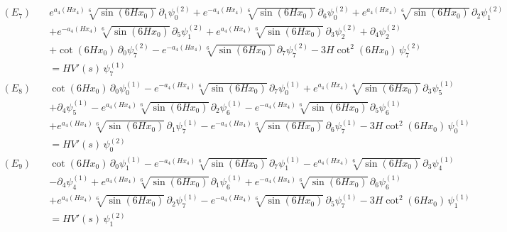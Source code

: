 \begin{align*}
(E_{7})\quad & e^{a_4\left(H x_4\right)} \sqrt[6]{\sin \left(6 H x_0\right)}\,\partial_{1}\psi^{(2)}_{0} + e^{-a_4\left(H x_4\right)} \sqrt[6]{\sin \left(6 H x_0\right)}\,\partial_{6}\psi^{(2)}_{0} + e^{a_4\left(H x_4\right)} \sqrt[6]{\sin \left(6 H x_0\right)}\,\partial_{2}\psi^{(2)}_{1} \\
 &  + e^{-a_4\left(H x_4\right)} \sqrt[6]{\sin \left(6 H x_0\right)}\,\partial_{5}\psi^{(2)}_{1} + e^{a_4\left(H x_4\right)} \sqrt[6]{\sin \left(6 H x_0\right)}\,\partial_{3}\psi^{(2)}_{2} + \partial_{4}\psi^{(2)}_{2} \\
 &  + \cot \left(6 H x_0\right)\,\partial_{0}\psi^{(2)}_{7} - e^{-a_4\left(H x_4\right)} \sqrt[6]{\sin \left(6 H x_0\right)}\,\partial_{7}\psi^{(2)}_{7} - 3 H \cot ^2\left(6 H x_0\right)\,\psi^{(2)}_{7} \\
 & = H V'(s)\,\psi^{(1)}_{7}
\end{align*}
\begin{align*}
(E_{8})\quad & \cot \left(6 H x_0\right)\,\partial_{0}\psi^{(1)}_{0} - e^{-a_4\left(H x_4\right)} \sqrt[6]{\sin \left(6 H x_0\right)}\,\partial_{7}\psi^{(1)}_{0} + e^{a_4\left(H x_4\right)} \sqrt[6]{\sin \left(6 H x_0\right)}\,\partial_{3}\psi^{(1)}_{5} \\
 &  + \partial_{4}\psi^{(1)}_{5} - e^{a_4\left(H x_4\right)} \sqrt[6]{\sin \left(6 H x_0\right)}\,\partial_{2}\psi^{(1)}_{6} - e^{-a_4\left(H x_4\right)} \sqrt[6]{\sin \left(6 H x_0\right)}\,\partial_{5}\psi^{(1)}_{6} \\
 &  + e^{a_4\left(H x_4\right)} \sqrt[6]{\sin \left(6 H x_0\right)}\,\partial_{1}\psi^{(1)}_{7} - e^{-a_4\left(H x_4\right)} \sqrt[6]{\sin \left(6 H x_0\right)}\,\partial_{6}\psi^{(1)}_{7} - 3 H \cot ^2\left(6 H x_0\right)\,\psi^{(1)}_{0} \\
 & = H V'(s)\,\psi^{(2)}_{0}
\end{align*}
\begin{align*}
(E_{9})\quad & \cot \left(6 H x_0\right)\,\partial_{0}\psi^{(1)}_{1} - e^{-a_4\left(H x_4\right)} \sqrt[6]{\sin \left(6 H x_0\right)}\,\partial_{7}\psi^{(1)}_{1} - e^{a_4\left(H x_4\right)} \sqrt[6]{\sin \left(6 H x_0\right)}\,\partial_{3}\psi^{(1)}_{4} \\
 &  - \partial_{4}\psi^{(1)}_{4} + e^{a_4\left(H x_4\right)} \sqrt[6]{\sin \left(6 H x_0\right)}\,\partial_{1}\psi^{(1)}_{6} + e^{-a_4\left(H x_4\right)} \sqrt[6]{\sin \left(6 H x_0\right)}\,\partial_{6}\psi^{(1)}_{6} \\
 &  + e^{a_4\left(H x_4\right)} \sqrt[6]{\sin \left(6 H x_0\right)}\,\partial_{2}\psi^{(1)}_{7} - e^{-a_4\left(H x_4\right)} \sqrt[6]{\sin \left(6 H x_0\right)}\,\partial_{5}\psi^{(1)}_{7} - 3 H \cot ^2\left(6 H x_0\right)\,\psi^{(1)}_{1} \\
 & = H V'(s)\,\psi^{(2)}_{1}
\end{align*}
